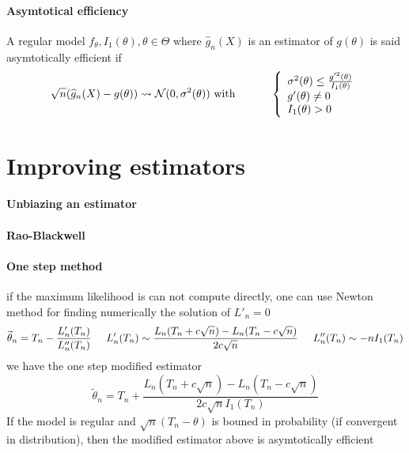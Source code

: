 \documentclass[a4paper,10pt]{article}
\begin{document}
\paragraph{Asymtotical efficiency} A regular model ${f_{\theta}, I_1(\theta), \theta \in \Theta}$ where 
$\widehat{g}_n(X)$ is an estimator of $g(\theta)$ is said asymtotically efficient if
\[
\sqrt{n}(\widehat{g}_n(X) - g(\theta) )  \rightsquigarrow   \mathcal{N}(0,\sigma^{2}(\theta) ) 
\text{ with }
\hspace{10mm}
\left\{
\begin{array}{l}
\sigma^{2}(\theta) \leq \frac{g'^2(\theta)}{I_1(\theta)} \\
g'(\theta) \neq 0  \\
I_1(\theta) > 0 
\end{array}\right.
\]  



\section{Improving estimators}
\paragraph{Unbiazing an estimator}
\paragraph{Rao-Blackwell}
\paragraph{One step method} if the maximum likelihood is can not compute directly, one can use Newton method for finding numerically 
the solution of $L'_n = 0 $
\[
\widetilde{\theta}_n =  T_n - \frac{L'_n(T_n)}{L''_n(T_n)} 
\hspace{5mm}
L'_n(T_n) \sim \frac{L_n(T_n + c\sqrt{n}) - L_n(T_n - c\sqrt{n}) }{2c\sqrt{n}}
\hspace{5mm}
L''_n(T_n) \sim -nI_1(T_n)
\]
we have the one step modified estimator
\[
\widetilde{\theta}_n =  T_n + \frac{L_n(T_n + c\sqrt{n}) - L_n(T_n - c\sqrt{n}) }{2c\sqrt{n} I_1(T_n)}
\]
If the model is regular and $\sqrt{n}(T_n - \theta)$ is bouned in probability (if convergent in distribution), then the modified estimator above is asymtotically efficient
\end{document}
